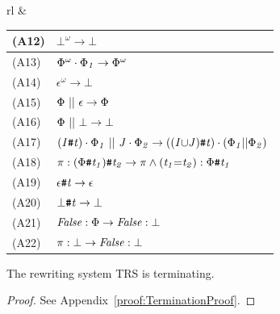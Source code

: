 \documentclass[acmsmall,10pt,review]{acmart}
\newcommand{\effect}{\textcolor{black}{\ensuremath{\mathrm{\Phi}}}}
\newcommand{\choice}{\vee}
\newcommand{\code}[1]{{\tt{\ensuremath{\m{#1}}}}}
\newcommand{\empt}{\textcolor{black}{\ensuremath{\epsilon}}}
\newcommand{\bott}{\textcolor{black}{\ensuremath{\bot}}}
\newcommand{\m}{\mathit}
\newcommand{\mysharp}{{\mathrel{\texttt{\#}}}}
\newcommand\appref[1]{Appendix~\textcolor{blue}{\ref{#1}}}
\begin{document}
{\begin{enumerate}
\begin{table}[ht]
\begin{tabular}{rl}
  &
\footnotesize
  \begin{minipage}[t]{0.6\textwidth}
\begin{tabular}{||l|l|}
\hline
(A12)  &
\code{\bot^\omega  \rightarrow \bot }\\
\hline
(A13)  &
\code{\effect^\omega \cdot \effect_1 \rightarrow \effect^\omega }\\
\hline
(A14)  &
\code{\epsilon^\omega \rightarrow \bot }\\
\hline
(A15)  &
\code{ \effect\ ||\ \empt \rightarrow \effect}\\
\hline
(A16)  &
\code{ \effect\ ||\ \bott \rightarrow \bott}\\
\hline
(A17)  &
 \code{(I\mysharp  t) \cdot \effect_1\ ||\ J \cdot\effect_2 \rightarrow ((I  {\cup} J) \mysharp  t) \cdot (\effect_1 || \effect_2)}\\
\hline
(A18)  &
\code{\pi : (\effect \mysharp  t_1 ) \mysharp  t_2 \rightarrow \pi  \wedge (t_1 {=} t_2) : \effect \mysharp  t_1 }\\
\hline
(A19)  &
 \code{\empt \mysharp  t \rightarrow \empt}\\
\hline
(A20)  &
 \code{\bot \mysharp  t \rightarrow  \bott}\\
\hline
(A21)  &
 \code{{{False}} : \effect \rightarrow {{False}} : \bott}\\
\hline
(A22)  &
 \code{{\pi} : \bott \rightarrow {{False}} : \bott}\\
\hline


\end{tabular}
  \end{minipage}
  

 
\end{tabular}
\end{table}



\end{enumerate}






 
\begin{theorem}[Termination]\label{termination}
The rewriting system TRS is terminating.
\end{theorem}
\begin{proof}
See %
\appref{proof:TerminationProof}.
\end{proof}

}
\end{document}
